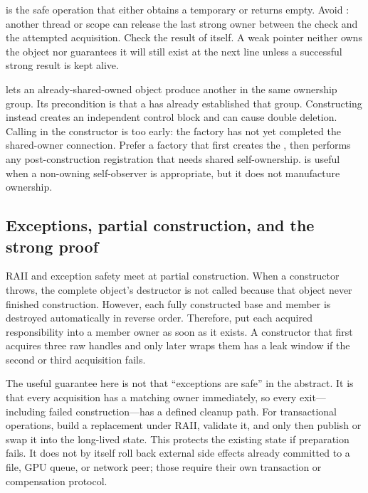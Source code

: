  is the safe operation that either obtains a temporary  or returns empty. Avoid : another thread or scope can release the last strong owner between the check and the attempted acquisition. Check the result of  itself. A weak pointer neither owns the object nor guarantees it will still exist at the next line unless a successful strong result is kept alive.

 lets an already-shared-owned object produce another  in the same ownership group. Its precondition is that a  has already established that group. Constructing  instead creates an independent control block and can cause double deletion. Calling  in the constructor is too early: the factory has not yet completed the shared-owner connection. Prefer a factory that first creates the , then performs any post-construction registration that needs shared self-ownership.  is useful when a non-owning self-observer is appropriate, but it does not manufacture ownership.

\subsection{Exceptions, partial construction, and the strong proof}\label{01-foundations-i-ch004-exceptions-partial-construction-and-the-strong-proof}

\hypertarget{01-foundations-i-ch004-exceptions-partial-construction-and-the-strong-proof}{}

RAII and exception safety meet at partial construction. When a constructor throws, the complete object's destructor is not called because that object never finished construction. However, each fully constructed base and member is destroyed automatically in reverse order. Therefore, put each acquired responsibility into a member owner as soon as it exists. A constructor that first acquires three raw handles and only later wraps them has a leak window if the second or third acquisition fails.

The useful guarantee here is not that ``exceptions are safe'' in the abstract. It is that every acquisition has a matching owner immediately, so every exit---including failed construction---has a defined cleanup path. For transactional operations, build a replacement under RAII, validate it, and only then publish or swap it into the long-lived state. This protects the existing state if preparation fails. It does not by itself roll back external side effects already committed to a file, GPU queue, or network peer; those require their own transaction or compensation protocol.

